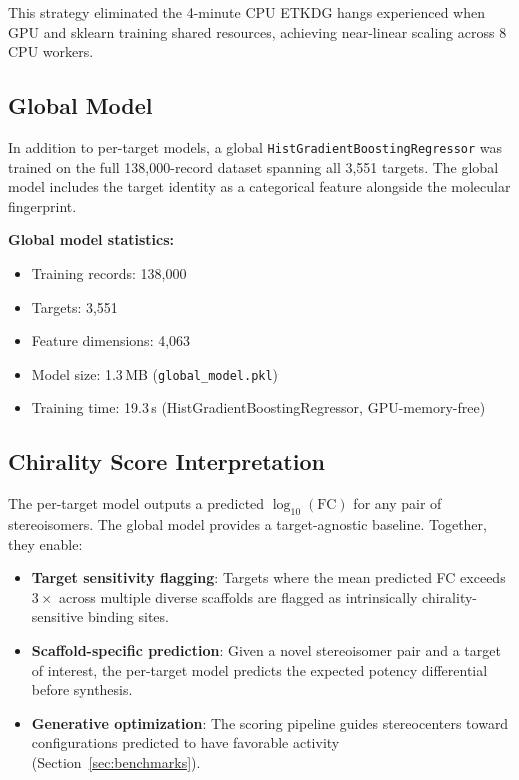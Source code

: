 \documentclass[11pt,a4paper]{article}
\begin{document}
This strategy eliminated the 4-minute CPU ETKDG hangs experienced when GPU
and sklearn training shared resources, achieving near-linear scaling across
8 CPU workers.

\subsection{Global Model}

In addition to per-target models, a global \texttt{HistGradientBoostingRegressor}
was trained on the full 138,000-record dataset spanning all 3,551 targets.
The global model includes the target identity as a categorical feature alongside
the molecular fingerprint.

\begin{keyresult}
\textbf{Global model statistics:}
\begin{itemize}[leftmargin=1.5em, itemsep=2pt]
  \item Training records: 138,000
  \item Targets: 3,551
  \item Feature dimensions: 4,063
  \item Model size: 1.3\,MB (\texttt{global\_model.pkl})
  \item Training time: 19.3\,s (HistGradientBoostingRegressor, GPU-memory-free)
\end{itemize}
\end{keyresult}

\subsection{Chirality Score Interpretation}

The per-target model outputs a predicted $\log_{10}(\text{FC})$ for any pair
of stereoisomers. The global model provides a target-agnostic baseline.
Together, they enable:

\begin{itemize}[leftmargin=1.5em]
  \item \textbf{Target sensitivity flagging}: Targets where the mean predicted
    FC exceeds $3\times$ across multiple diverse scaffolds are flagged as
    intrinsically chirality-sensitive binding sites.
  \item \textbf{Scaffold-specific prediction}: Given a novel stereoisomer pair
    and a target of interest, the per-target model predicts the expected potency
    differential before synthesis.
  \item \textbf{Generative optimization}: The scoring pipeline guides
    stereocenters toward configurations predicted to have favorable activity
    (Section~\ref{sec:benchmarks}).
\end{itemize}
\end{document}
